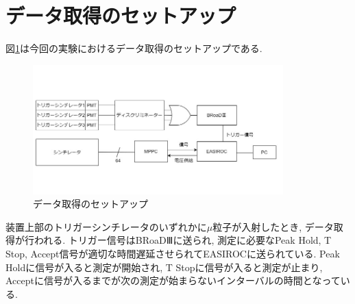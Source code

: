 \section{データ取得のセットアップ}
図\ref{fig:setup}は今回の実験におけるデータ取得のセットアップである.
\begin{figure}[H]
    \centering
    \includegraphics[height=5cm]{img/setup.jpg}
    \caption{データ取得のセットアップ}
    \label{fig:setup}
\end{figure}
装置上部のトリガーシンチレータのいずれかに$\mu$粒子が入射したとき, データ取得が行われる.
トリガー信号はBRoaDⅢに送られ, 測定に必要なPeak Hold, T Stop, Accept信号が適切な時間遅延させられてEASIROCに送られている.
Peak Holdに信号が入ると測定が開始され, T Stopに信号が入ると測定が止まり, Acceptに信号が入るまでが次の測定が始まらないインターバルの時間となっている.

